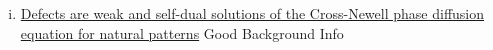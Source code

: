 \documentclass[12pt]{article}
\newcounter{solution}
\begin{document}
\begin{enumerate}[(i)]
    \item \href{https://pdf.sciencedirectassets.com/271587/1-s2.0-S0167278900X00413/1-s2.0-0167278996000735/main.pdf?X-Amz-Security-Token=IQoJb3JpZ2luX2VjEMv%2F%2F%2F%2F%2F%2F%2F%2F%2F%2FwEaCXVzLWVhc3QtMSJHMEUCICmbWyR64A1wCI3Hwg0ZAgI5HIKnTPMRuOHwDh8dvgCFAiEAo%2Fvnx31Z1bd2dlu%2B%2FTBKoMzF7OknS8%2BgUliZTPlrYEwq0gQIVBAFGgwwNTkwMDM1NDY4NjUiDPr4xcbS9wqegfVPTiqvBO1WuMO530B3ssrnBJBF2jZDPbMMGvRGoFzsHIM8EpkK08FfaRD5RNFVZxYkJYQVYTxa4ns4mxO3oA5T1V3Q8iMQd5BelLkb5xlTX17Eob3KM7y9KK1zGhl9KY9rVR610tnFbxJNFYRWcb2hfHIkUhm%2Bmjlg8cybbS3BNU%2Fry6O9Q2XZIAZgccbYdizTpcjVMRcnMvPEcLYqR7LexxPXdtpqfSZ5GXHvAeUfj1tU%2FvSpqtdKlm2eQj3bdww%2B0%2B4Xiava75hcOqspQwvuoObW1Z3dS0C0nsyA%2FYHwwcv16QVKkX4DK1T6r3%2BHBZfQ5ypS3Us8VOfCdp7jexHz7%2FVsNOgGsjVPPyPRrDIfmN68UyXfr5vvTewd2%2BHStXu%2B1PQzF7pZ1DgfgNZ69V%2FCasRg44o6nK3B%2F04EBWfMz6wGieRBvpaUn8vUmPvbNgqntQ54LTYD49FlNJ9k286nQWFR6CxSO7Pk3fPjdgRA9wvC8%2BvlQFxxoKN75XqQ6IYh6awfJ%2F1IF3GwF2Gdr7VZS5Sy1vNeeHZOF38lvshcxoJW3T3PVN6ND4RiT5nYBUjCylITe5gTzcppmByoOOn7c7exfmEwitcrUrVHCu16omd9baWv6%2FzacUhVr4A02OzgcwSxNt9M3X3stas%2BIKyahpP%2FLVuxoHmTl50NczRduwjyfeBgrcCu1FU9ro6Fwfh7LdEHLaINFCRBNPfyTeipDNBgbw9R2OFQXIs0X6jZuWaryKAw6ZW7mAY6qQFMWxe1bdc%2FwqwqcL6mCyutB%2BaxuC5WRGi8jw36M%2FjG5VdiunTYwJwkaf7sFeNK4lIp%2BCMzJKKR7vQIAkxJLXhTQMu%2BOstiT07iIvnDIC6TkIg7%2FVRLxD3tLR3cP9uUt4KUles514ga8GtRecA62d8KUwQn2em9XmR7jEyKhx4VU7s9fAPHqI6UpQYUxEoQi3rKjOmBv1g4axZh1gt%2BRxhO9wP1yha84rUX&X-Amz-Algorithm=AWS4-HMAC-SHA256&X-Amz-Date=20220831T041003Z&X-Amz-SignedHeaders=host&X-Amz-Expires=299&X-Amz-Credential=ASIAQ3PHCVTYRORY7RZH%2F20220831%2Fus-east-1%2Fs3%2Faws4_request&X-Amz-Signature=33c46dee6ce60298dd9043b562ade6356f713732db70f3b1fb742bae8342c347&hash=2bd236b77bbc2fe06aaf61faddfc1011fff08b04c4195c0dedf7f60afcae1e04&host=68042c943591013ac2b2430a89b270f6af2c76d8dfd086a07176afe7c76c2c61&pii=0167278996000735&tid=spdf-be71a088-5432-4119-8437-d62940a7ffbf&sid=f4108f064053494679698ac9f79c6b821331gxrqa&type=client&ua=4d54575503015e5b545b&rr=7432ea0978fd1b0f}{Defects are weak and self-dual solutions of the Cross-Newell phase diffusion equation for natural patterns} Good Background Info

\end{enumerate}
\end{document}

